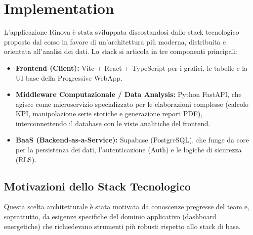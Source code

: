 \setcounter{section}{2}
\setlength{\parindent}{0pt}  %
\setlength{\parskip}{6pt}
\section{Implementation}
L'applicazione Rinova è stata sviluppata discostandosi dallo stack tecnologico proposto dal corso in favore di un'architettura più moderna, distribuita e orientata all'analisi dei dati. Lo stack si articola in tre componenti principali:
\begin{itemize}
    \item \textbf{Frontend (Client):} Vite + React + TypeScript per i grafici, le tabelle e la UI base della Progressive WebApp.
    \item \textbf{Middleware Computazionale / Data Analysis:} Python FastAPI, che agisce come microservizio specializzato per le elaborazioni complesse (calcolo KPI, manipolazione serie storiche e generazione report PDF), interconnettendo il database con le viste analitiche del frontend.
    \item \textbf{BaaS (Backend-as-a-Service):} Supabase (PostgreSQL), che funge da core per la persistenza dei dati, l'autenticazione (Auth) e le logiche di sicurezza (RLS).
\end{itemize}

\subsection{Motivazioni dello Stack Tecnologico}
Questa scelta architetturale è stata motivata da conoscenze pregresse del team e, soprattutto, da esigenze specifiche del dominio applicativo (dashboard energetiche) che richiedevano strumenti più robusti rispetto allo stack di base.


